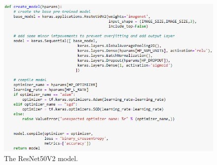 \begin{figure}[H]
    \centering
    \includegraphics[width=\textwidth]{figures/resnet-model.png}
    \caption{The ResNet50V2 model.}
    \label{fig:resnet-model}
\end{figure}